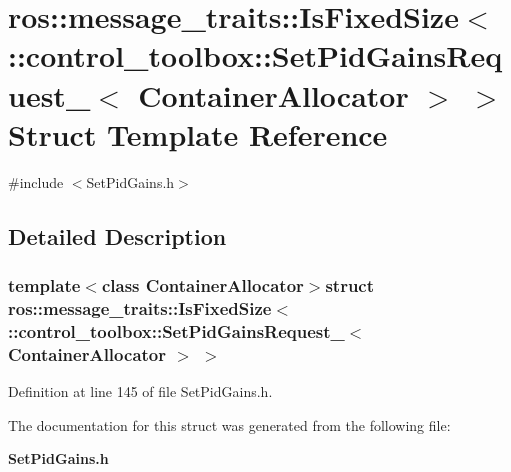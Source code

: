 \section{ros\-:\-:message\-\_\-traits\-:\-:\-Is\-Fixed\-Size$<$ \-:\-:control\-\_\-toolbox\-:\-:\-Set\-Pid\-Gains\-Request\-\_\-$<$ \-Container\-Allocator $>$ $>$ \-Struct \-Template \-Reference}
\label{structros_1_1message__traits_1_1IsFixedSize_3_01_1_1control__toolbox_1_1SetPidGainsRequest___3_01ContainerAllocator_01_4_01_4}


{\ttfamily \#include $<$\-Set\-Pid\-Gains.\-h$>$}



\subsection{\-Detailed \-Description}
\subsubsection*{template$<$class Container\-Allocator$>$struct ros\-::message\-\_\-traits\-::\-Is\-Fixed\-Size$<$ \-::control\-\_\-toolbox\-::\-Set\-Pid\-Gains\-Request\-\_\-$<$ Container\-Allocator $>$ $>$}



\-Definition at line 145 of file \-Set\-Pid\-Gains.\-h.



\-The documentation for this struct was generated from the following file\-:\begin{DoxyCompactItemize}
\item 
{\bf \-Set\-Pid\-Gains.\-h}\end{DoxyCompactItemize}
